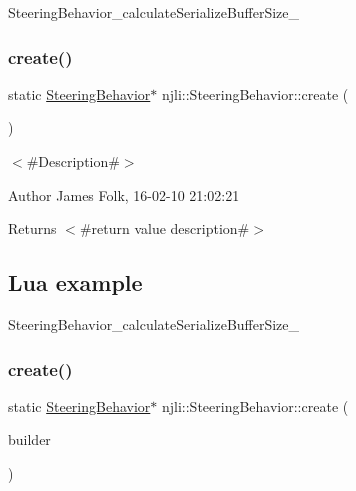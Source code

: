 \begin{DoxyCodeInclude}
\end{DoxyCodeInclude}
Steering\+Behavior\+\_\+calculate\+Serialize\+Buffer\+Size\+\_\+ \mbox{\label{classnjli_1_1_steering_behavior_a41c2781070017d2faf5cd5bdabb36d09}} 
\subsubsection{\texorpdfstring{create()}{create()}\hspace{0.1cm}{\footnotesize\ttfamily [1/2]}}
{\footnotesize\ttfamily static \mbox{\hyperlink{classnjli_1_1_steering_behavior}{Steering\+Behavior}}$\ast$ njli\+::\+Steering\+Behavior\+::create (\begin{DoxyParamCaption}{ }\end{DoxyParamCaption})\hspace{0.3cm}{\ttfamily [static]}}



$<$\#\+Description\#$>$ 

\begin{DoxyAuthor}{Author}
James Folk, 16-\/02-\/10 21\+:02\+:21
\end{DoxyAuthor}
\begin{DoxyReturn}{Returns}
$<$\#return value description\#$>$
\end{DoxyReturn}
\hypertarget{classnjli_1_1_steering_behavior_wander_ex1}{}\subsection{Lua example}\label{classnjli_1_1_steering_behavior_wander_ex1}

\begin{DoxyCodeInclude}
\end{DoxyCodeInclude}
Steering\+Behavior\+\_\+calculate\+Serialize\+Buffer\+Size\+\_\+ \mbox{\label{classnjli_1_1_steering_behavior_af58fefc1f70b9399aa6369fb19c1e0b6}} 
\subsubsection{\texorpdfstring{create()}{create()}\hspace{0.1cm}{\footnotesize\ttfamily [2/2]}}
{\footnotesize\ttfamily static \mbox{\hyperlink{classnjli_1_1_steering_behavior}{Steering\+Behavior}}$\ast$ njli\+::\+Steering\+Behavior\+::create (\begin{DoxyParamCaption}\item[{const \mbox{\hyperlink{classnjli_1_1_steering_behavior_builder}{Steering\+Behavior\+Builder}} \&}]{builder }\end{DoxyParamCaption})\hspace{0.3cm}{\ttfamily [static]}}



